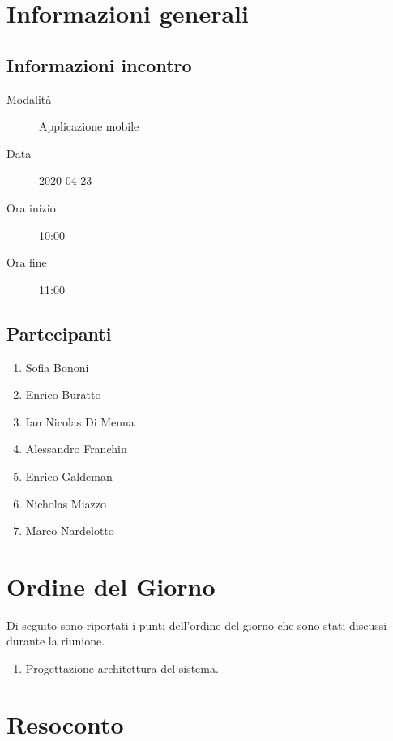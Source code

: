 \documentclass{article}
\begin{document}


\section{Informazioni generali}%
\label{sec:informazioni_generali}

\subsection{Informazioni incontro}%
\label{sub:informazioni_incontro}

\begin{description}
  \item[Modalità] Applicazione mobile 
  \item[Data] 2020-04-23
  \item[Ora inizio] 10:00
  \item[Ora fine] 11:00
\end{description}

\subsection{Partecipanti}%
\label{sub:partecipanti}

\begin{enumerate}
  \item Sofia Bononi
  \item Enrico Buratto
  \item Ian Nicolas Di Menna
  \item Alessandro Franchin
  \item Enrico Galdeman
  \item Nicholas Miazzo
  \item Marco Nardelotto
\end{enumerate}

\section{Ordine del Giorno}%
\label{ordine_del_giorno}
Di seguito sono riportati i punti dell'ordine del giorno che sono stati discussi durante la riunione.
\begin{enumerate}
  \item Progettazione architettura del sistema.
\end{enumerate}

\section{Resoconto}%
\label{resoconto}
\end{document}
